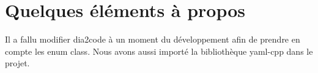 \section{Quelques éléments à propos }
\label{Des infos}
Il a fallu modifier dia2code à un moment du développement afin de prendre en compte les enum class.
Nous avons aussi importé la bibliothèque yaml-cpp dans le projet.